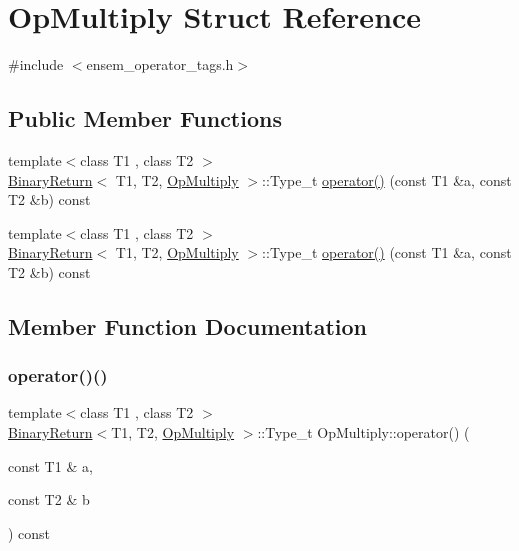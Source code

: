 \hypertarget{structOpMultiply}{}\section{Op\+Multiply Struct Reference}
\label{structOpMultiply}


{\ttfamily \#include $<$ensem\+\_\+operator\+\_\+tags.\+h$>$}

\subsection*{Public Member Functions}
\begin{DoxyCompactItemize}
\item 
{\footnotesize template$<$class T1 , class T2 $>$ }\\\mbox{\hyperlink{structBinaryReturn}{Binary\+Return}}$<$ T1, T2, \mbox{\hyperlink{structOpMultiply}{Op\+Multiply}} $>$\+::Type\+\_\+t \mbox{\hyperlink{structOpMultiply_a47917bc9d52d19692e9716a60938d364}{operator()}} (const T1 \&a, const T2 \&b) const
\item 
{\footnotesize template$<$class T1 , class T2 $>$ }\\\mbox{\hyperlink{structBinaryReturn}{Binary\+Return}}$<$ T1, T2, \mbox{\hyperlink{structOpMultiply}{Op\+Multiply}} $>$\+::Type\+\_\+t \mbox{\hyperlink{structOpMultiply_a47917bc9d52d19692e9716a60938d364}{operator()}} (const T1 \&a, const T2 \&b) const
\end{DoxyCompactItemize}


\subsection{Member Function Documentation}
\mbox{\label{structOpMultiply_a47917bc9d52d19692e9716a60938d364}} 
\subsubsection{\texorpdfstring{operator()()}{operator()()}\hspace{0.1cm}{\footnotesize\ttfamily [1/2]}}
{\footnotesize\ttfamily template$<$class T1 , class T2 $>$ \\
\mbox{\hyperlink{structBinaryReturn}{Binary\+Return}}$<$T1, T2, \mbox{\hyperlink{structOpMultiply}{Op\+Multiply}} $>$\+::Type\+\_\+t Op\+Multiply\+::operator() (\begin{DoxyParamCaption}\item[{const T1 \&}]{a,  }\item[{const T2 \&}]{b }\end{DoxyParamCaption}) const\hspace{0.3cm}{\ttfamily [inline]}}

